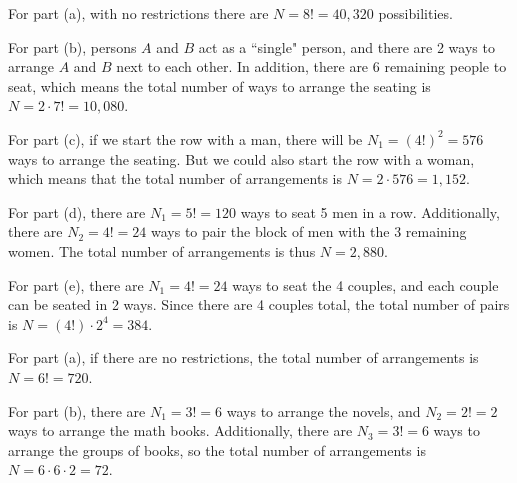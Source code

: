 \documentclass[a4paper,12pt]{article}
\begin{document}
\vspace{2mm}
For part (a), with no restrictions there are $N = 8! = 40,320$ possibilities. 

\vspace{2mm}
For part (b), persons $A$ and $B$ act as a ``single" person, and there are 2 ways to arrange $A$ and $B$ next to each other. In addition, there are 6 remaining people to seat, which means the total number of ways to arrange the seating is $N = 2 \cdot 7! = 10,080$.

\vspace{2mm}
For part (c), if we start the row with a man, there will be $N_1 = (4!)^2 = 576$ ways to arrange the seating. But we could also start the row with a  woman, which means that the total number of arrangements is $N = 2 \cdot 576 = 1,152$.

\vspace{2mm}
For part (d), there are $N_1 = 5!  = 120$ ways to seat 5 men in a  row. Additionally, there are $N_2 = 4! = 24$ ways to pair the block of men with the 3 remaining women. The total number of arrangements is thus $N = 2,880$. 

\vspace{2mm}
For part (e), there are $N_1 = 4! = 24$ ways to seat the 4 couples, and each couple can be seated in 2 ways. Since there are 4 couples total, the total number of pairs is $N = (4!) \cdot 2^4 = 384$.

\vspace{4mm}

\vspace{2mm}
For part (a), if there are no restrictions, the total number of arrangements is $N = 6! = 720$. 

\vspace{2mm}
For part (b), there are $N_1 = 3! = 6$ ways to arrange the novels, and $N_2 = 2! = 2$ ways to arrange the math books. Additionally, there are $N_3 = 3! = 6$ ways to arrange the groups of books, so the total number of arrangements is $N = 6 \cdot 6 \cdot 2 = 72$.
\end{document}
